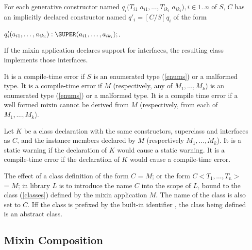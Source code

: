\documentclass{article}
\newcommand{\code}[1]{{\sf #1}}
\begin{document}
\LMHash{}
For each generative constructor named $q_i(T_{i1}$ $ a_{i1}, \ldots , T_{ik_i}$ $ a_{ik_i}), i \in 1..n$ of $S$, $C$ has an implicitly declared constructor named
$q'_i = [C/S]q_i$ of the form 

$q'_i(a_{i1}, \ldots , a_{ik_i}):\SUPER(a_{i1}, \ldots , a_{ik_i});$.


\LMHash{}
If the mixin application declares support for interfaces, the resulting class implements those interfaces.

\LMHash{}
It is a compile-time error if $S$ is an enumerated type (\ref{enums}) or a malformed type. It is a compile-time error if $M$ (respectively, any of $M_1, \ldots, M_k$) is an enumerated type (\ref{enums}) or a malformed type. It is a compile time error if a well formed mixin cannot be derived from $M$ (respectively, from each of $M_1, \ldots, M_k$). 

\LMHash{}
Let $K$ be a class declaration  with the same constructors, superclass and interfaces as $C$,  and the instance members declared by $M$ (respectively $M_1, \ldots, M_k$). It is a static warning if the declaration of $K$ would cause a static warning.  It is a compile-time error if the declaration of $K$ would cause a compile-time error.


\LMHash{}
The effect of a class definition of the form \code{\CLASS{} $C$ = $M$; } or the form 
 \code{\CLASS{} $C<T_1, \ldots, T_n>$ = $M$; } in library $L$  is to introduce the name $C$ into the scope of $L$, bound to the class (\ref{classes}) defined by the mixin application $M$. The name of the class is also set to $C$. Iff the  class is prefixed by the built-in identifier \ABSTRACT{}, the class being defined is an abstract class.
 

\subsection{Mixin Composition}

\end{document}
